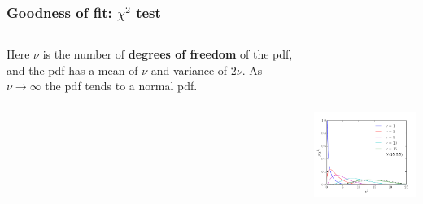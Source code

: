 \begin{frame}

\frametitle{Goodness of fit: $\chi^2$ test}
\label{goodnessoffit:chi2test}

\begin{columns}
    \begin{column}{0.25\textwidth}

Here $\nu$ is the number of \textbf{degrees of freedom} of the pdf, and the pdf has a mean of $\nu$ and variance of $2\nu$. As $\nu \rightarrow \infty$ the pdf tends to a normal pdf.
\end{column}
    \begin{column}{0.75\textwidth}
\includegraphics[keepaspectratio,width=\textwidth,height=200pt]{figures/chisquared.pdf}
\end{column}
\end{columns}

\end{frame}

